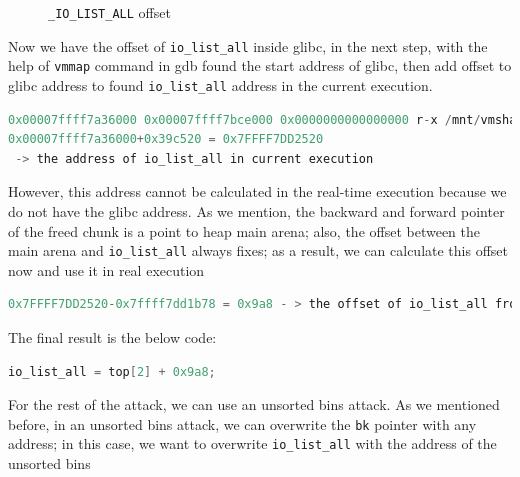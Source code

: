 \documentclass{masterthesis}
\newcommand*\libc{glibc}
\newcommand*\ub{unsorted bins}
\begin{document}
\begin{figure}[h!]
 \caption{\lstinline{_IO_LIST_ALL} offset}
 \label{fig:offset}
\end{figure}


Now we have the offset of \lstinline{io_list_all} inside \libc{}, in the next step, with the help of \lstinline{vmmap} command in gdb found the start address of \libc{}, then add offset to \libc{} address to found \lstinline{io_list_all} address in the current execution.
\begin{lstlisting}[language=c,frame=tlrb]
0x00007ffff7a36000 0x00007ffff7bce000 0x0000000000000000 r-x /mnt/vmshare/MasterThesis/libc223/libc.so.6
0x00007ffff7a36000+0x39c520 = 0x7FFFF7DD2520
 -> the address of io_list_all in current execution
\end{lstlisting}



However, this address cannot be calculated in the real-time execution because we do not have the \libc{} address. As we mention, the backward and forward pointer of the freed chunk is a point to heap main arena; also, the offset between the main arena and \lstinline{io_list_all} always fixes; as a result, we can calculate this offset now and use it in real execution
\begin{lstlisting}[language=c,frame=tlrb]
0x7FFFF7DD2520-0x7ffff7dd1b78 = 0x9a8 - > the offset of io_list_all from main arena
\end{lstlisting}

The final result is the below code:

\begin{lstlisting}[language=c,frame=tlrb]
io_list_all = top[2] + 0x9a8;
\end{lstlisting}

For the rest of the attack, we can use an \ub{} attack. As we mentioned before, in an \ub{} attack, we can overwrite the \lstinline{bk} pointer with any address; in this case, we want to overwrite \lstinline{io_list_all} with the address of the \ub{}
\end{document}
